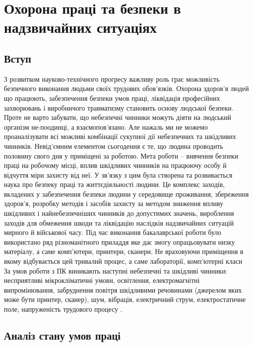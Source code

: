 \documentclass[12pt,a4paper]{article}
\begin{document}
\section{Охорона праці та безпеки в надзвичайних ситуаціях}

\subsection{Вступ}
З розвитком науково-технічного прогресу важливу роль грає можливість безпечного виконання людьми своїх трудових обов'язків.
Охорона здоров'я людей що працюють, забезпечення безпеки умов праці, ліквідація професійних захворювань і виробничого травматизму становить основу людської безпеки. Проте не варто забувати, що небезпечні чинники можуть діяти на людський організм не-поодинці, а взаємопов’язано. Але нажаль ми не можемо проаналізувати всі можливі комбінації сукупної дії небезпечних та шкідливих чинників. Невід’ємним елементом сьогодення є те, що людина проводить половину свого дня у приміщені за роботою.
Мета роботи – вивчення безпеки праці на робочому місці, вплив шкідливих чинників на працюючу особу й відчуття міри захисту від неї.
У зв’язку з цим була створена та розвивається наука про безпеку праці та життєдіяльності людини. Це комплекс заходів, вкладених у забезпечення безпеки людини у середовище проживання, збереження здоров'я, розробку методів і засобів захисту за методом зниження впливу шкідливих і найнебезпечніших чинників до допустимих значень, вироблення заходів для обмеження шкоди та ліквідацію наслідків надзвичайних ситуацій мирного й військової часу.
Під час виконання бакалаврської роботи було використано ряд різноманітного приладдя яке дає змогу опрацьовувати низку матеріалу, а саме комп’ютери, принтери, сканери. Не враховуючи приміщення в якому відбувається цей тривалий процес, а саме лабораторії, комп’ютерні класи
За умов роботи з ПК виникають наступні небезпечні та шкідливі чинники: несприятливі мікрокліматичні умови, освітлення, електромагнітні випромінювання, забруднення повітря шкідливими речовинами (джерелом яких може бути принтер, сканер), шум, вібрація, електричний струм, електростатичне поле, напруженість трудового процесу .


\subsection{Аналіз стану умов праці}
\end{document}
